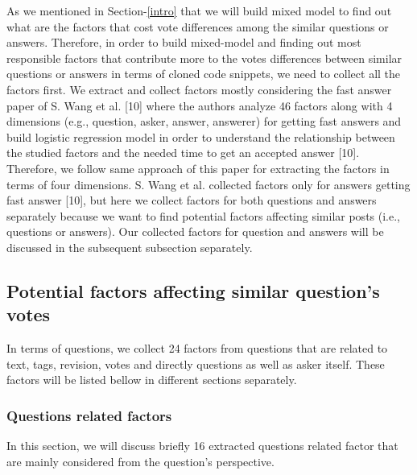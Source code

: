 \documentclass[conference]{IEEEtran}
\begin{document}
	As we mentioned in Section-\ref{intro} that we will build mixed model to find out what are the factors that cost vote differences among the similar questions or answers. Therefore, in order to build mixed-model and finding out most responsible factors that contribute more to the votes differences between similar questions or answers in terms of cloned code snippets, we need to collect all the factors first. We extract and collect factors mostly considering the fast answer paper of S. Wang et al. [10] where the authors analyze 46 factors along with 4 dimensions (e.g., question, asker, answer, answerer) for getting fast answers and build logistic regression model in order to understand the relationship between the studied factors and the needed time to get an accepted answer [10]. Therefore, we follow same approach of this paper for extracting the factors in terms of four dimensions. S. Wang et al. collected factors only for answers getting fast answer [10], but here we collect factors for both questions and answers separately because we want to find potential factors affecting similar posts (i.e., questions or answers). Our collected factors  for question and answers will be discussed in the subsequent subsection separately. 
	
	\subsection{Potential factors affecting similar question's votes}
	In terms of questions, we collect 24 factors from questions that are related to text, tags, revision, votes and directly questions as well as asker itself. These factors will be listed bellow in different sections separately. 
	 
	\subsubsection{Questions related factors}\label{QF}
	In this section, we will discuss briefly 16 extracted questions related factor that are mainly considered from the question's perspective.
	
\end{document}
